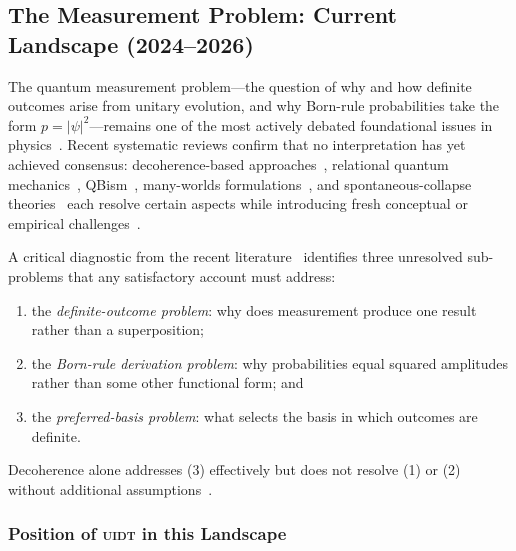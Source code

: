 %
\subsection{The Measurement Problem: Current Landscape (2024--2026)}
\label{sec:mp_context}

The quantum measurement problem---the question of why and how definite
outcomes arise from unitary evolution, and why Born-rule probabilities
take the form $p = |\psi|^2$---remains one of the most actively debated
foundational issues in physics~\cite{Zurek2003,Schlosshauer2004}.
Recent systematic reviews confirm that no interpretation has yet achieved
consensus: decoherence-based approaches~\cite{Schlosshauer2004},
relational quantum mechanics~\cite{Rovelli1996}, QBism~\cite{Fuchs2014},
many-worlds formulations~\cite{Everett1957}, and spontaneous-collapse
theories~\cite{GRW1986} each resolve certain aspects while introducing
fresh conceptual or empirical challenges~\cite{MeasurementReview2025}.

A critical diagnostic from the recent literature~\cite{MeasurementReview2025}
identifies three unresolved sub-problems that any satisfactory account
must address:
\begin{enumerate}[leftmargin=1.8em,itemsep=2pt]
  \item the \emph{definite-outcome problem}: why does measurement produce
        one result rather than a superposition;
  \item the \emph{Born-rule derivation problem}: why probabilities equal
        squared amplitudes rather than some other functional form; and
  \item the \emph{preferred-basis problem}: what selects the basis in
        which outcomes are definite.
\end{enumerate}
Decoherence alone addresses (3) effectively but does not resolve (1) or (2)
without additional assumptions~\cite{Schlosshauer2004}.

\subsubsection*{Position of \textsc{uidt} in this Landscape}


